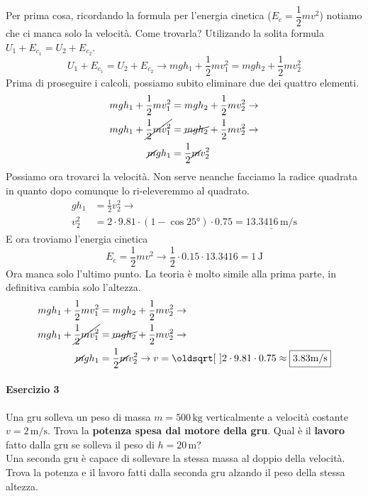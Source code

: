Per prima cosa, ricordando la formula per l'energia cinetica ($E_c = \dfrac{1}{2}mv^2$) notiamo che ci
manca solo la velocità. Come trovarla? Utilizando la solita formula $U_1+E_{c_1} = U_2 + E_{c_2}$.
\begin{equation*}
U_1+E_{c_1} = U_2 + E_{c_2} \rightarrow mgh_1 + \frac{1}{2}mv_1^2 = mgh_2 + \frac{1}{2}mv_2^2
\end{equation*}
Prima di proseguire i calcoli, possiamo subito eliminare due dei quattro elementi.
\begin{align*}
mgh_1 + \frac{1}{2}mv_1^2 &= mgh_2 + \frac{1}{2}mv_2^2 \rightarrow\\
mgh_1 + \cancel{\frac{1}{2}mv_1^2} &= \cancel{mgh_2} + \frac{1}{2}mv_2^2 \rightarrow\\
\cancel{m}gh_1 &= \frac{1}{2}\cancel{m}v_2^2
\end{align*}
Possiamo ora trovarci la velocità. Non serve neanche facciamo la radice quadrata in quanto dopo 
comunque lo ri-eleveremmo al quadrato.
\begin{align*}
gh_1 &= \frac{1}{2}v_2^2 \rightarrow \\
v_2^2 &= 2\cdot9.81\cdot(1-\cos\ang{25})\cdot0.75 = 
\underline{13.3416\,\text{m/s}}
\end{align*}
E ora troviamo l'energia cinetica
\begin{equation*}
E_c = \frac{1}{2}mv^2 \rightarrow \frac{1}{2}\cdot0.15\cdot13.3416 = \boxed{1\,\text{J}}
\end{equation*}
Ora manca solo l'ultimo punto. La teoria è molto simile alla prima parte, in definitiva cambia solo 
l'altezza.
\begin{align*}
mgh_1 + \frac{1}{2}mv_1^2 &= mgh_2 + \frac{1}{2}mv_2^2 \rightarrow\\
mgh_1 + \cancel{\frac{1}{2}mv_1^2} &= \cancel{mgh_2} + \frac{1}{2}mv_2^2 \rightarrow\\
\cancel{m}gh_1 &= \frac{1}{2}\cancel{m}v_2^2 \rightarrow
v = \sqrt{2\cdot9.81\cdot0.75} \approx \boxed{3.83\text{m/s}}
\end{align*}

\paragraph{Esercizio 3}
Una gru solleva un peso di massa $m = 500\,\text{kg}$ verticalmente a velocità costante 
$v = 2\,\text{m/s}$. Trova la \textbf{potenza spesa dal motore della gru}. Qual è il \textbf{lavoro}
fatto dalla gru se solleva il peso di $h = 20\,\text{m}$?\\
Una seconda gru è capace di sollevare la stessa massa al doppio della velocità. Trova la potenza
e il lavoro fatti dalla seconda gru alzando il peso della stessa altezza.

